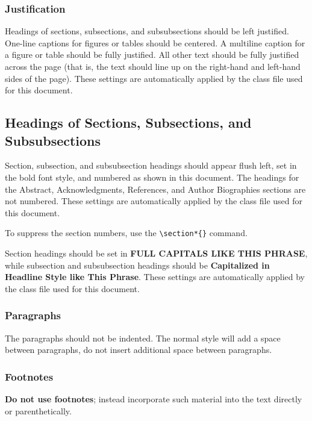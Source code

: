 \documentclass{scspaperproc}
\theoremstyle{scsthe}
\begin{document}
\subsubsection{Justification}

Headings of sections, subsections, and subsubsections should be left justified. One-line captions for figures or tables should be centered. A multiline caption for a figure or table should be fully justified. All other text should be fully justified across the page (that is, the text should line up on the right-hand and left-hand sides of the page). These settings are automatically applied by the class file used for this document.

\subsection{Headings of Sections, Subsections, and Subsubsections}

Section, subsection, and subsubsection headings should appear flush left, set in the bold font style, and numbered as shown in this document. The headings for the Abstract, Acknowledgments, References, and Author Biographies sections are not numbered. These settings are automatically applied by the class file used for this document.

To suppress the section numbers, use the \verb+\section*{}+ command.

Section headings should be set in \textbf{\uppercase{full capitals like this phrase}}, while subsection and subsubsection headings should be \textbf{Capitalized
in Headline Style like This Phrase}. These settings are automatically applied by the class file used for this document.

\subsubsection{Paragraphs}
The paragraphs should not be indented. The normal style will add a space between paragraphs, do not insert additional space between paragraphs.

\subsubsection{Footnotes}
\textbf{Do not use footnotes}; instead incorporate such material into the text directly or parenthetically.
\end{document}
